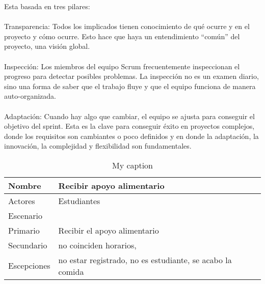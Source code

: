 Esta basada en tres pilares:
\\
\\
Transparencia: Todos los implicados tienen conocimiento de qué ocurre y en el proyecto y cómo ocurre. Esto hace que haya un entendimiento “común” del proyecto, una visión global.
\\
\\
Inspección: Los miembros del equipo Scrum frecuentemente inspeccionan el progreso para detectar posibles problemas. La inspección no es un examen diario, sino una forma de saber que el trabajo fluye y que el equipo funciona de manera auto-organizada.
\\
\\
Adaptación: Cuando hay algo que cambiar, el equipo se ajusta para conseguir el objetivo del sprint. Esta es la clave para conseguir éxito en proyectos complejos, donde los requisitos son cambiantes o poco definidos y en donde la adaptación, la innovación, la complejidad y flexibilidad son fundamentales.

\begin{table}[]
\centering
\caption{My caption}
\label{my-label}
\begin{tabular}{|l|l|}
\hline
Nombre      & Recibir apoyo alimentario                                 \\ \hline
Actores     & Estudiantes                                               \\ \hline
Escenario   &                                                           \\ \hline
Primario    & Recibir el apoyo alimentario                              \\ \hline
Secundario  & no coinciden horarios,                                    \\ \hline
Escepciones & no estar registrado, no es estudiante, se acabo la comida \\ \hline
\end{tabular}
\end{table}
